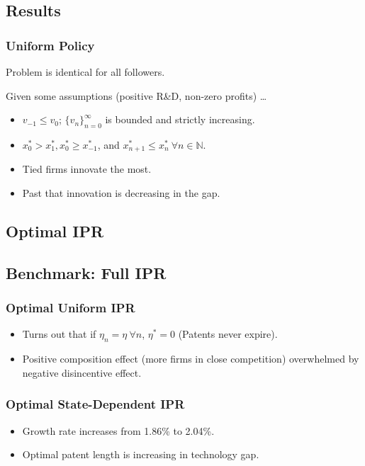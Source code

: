 \documentclass{beamer}
\begin{document}
\subsection{Results}
\label{sub:results}
\begin{frame}[t]\frametitle{Uniform Policy} 
Problem is identical for all followers.

Given some assumptions (positive R\&D, non-zero profits) \ldots
\begin{itemize}
  \item<+-> $v_{-1} \leq v_0$; $\{v_n\}_{n=0}^{\infty}$ is bounded and strictly increasing.
  \item<+-> $x_0^* > x_1^*, x_0^* \geq x_{-1}^*$, and $x_{n+1}^* \leq x_n^*\ \forall n \in \mathbb{N}$.
  \item<2> Tied firms innovate the most.
  \item<2> Past that innovation is decreasing in the gap.
\end{itemize}
\end{frame}

\subsection{Optimal IPR}
\label{sub:optimal_ipr}
\subsection{Benchmark: Full IPR}
\label{sub:benchmark_full_ipr}
\begin{frame}[t]\frametitle{Optimal Uniform IPR} 
  \begin{itemize}
    \item<+-> Turns out that if $\eta_n = \eta \ \forall n$, $\eta^* = 0$ (Patents never expire).
    \item<+-> Positive composition effect (more firms in close competition) overwhelmed by negative disincentive effect.
  \end{itemize}
\end{frame}

\begin{frame}[t]\frametitle{Optimal State-Dependent IPR} 
  \begin{itemize}
    \item<+-> Growth rate increases from 1.86\% to 2.04\%.
    \item<+-> Optimal patent length is increasing in technology gap. 
  \end{itemize}
\end{frame}
\end{document}
